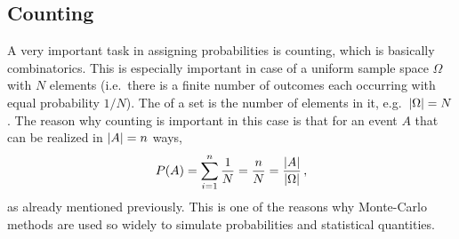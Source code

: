 \begin{table}[t]
\centering



\caption{Visual representation of the sample space of two consecutive coin flips (where a fair coin is assumed, every outcome has the same probability of $\frac{1}{4}$. As the axes labels indicate, the $x$-axis is used for results of the first flip and the $y$-axis for results of the second flip.}

\label{tab:ss_double_coinflip}
\end{table}



	\subsection{Counting}
A very important task in assigning probabilities is counting, which is basically combinatorics. This is especially important in case of a uniform sample space $\Omega$ with $N$ elements (i.e.~there is a finite number of outcomes each occurring with equal probability $1 / N$). The  of a set is the number of elements in it, e.g.~$\abs{\Omega} = N$. The reason why counting is important in this case is that for an event $A$ that can be realized in $\abs{A} = n$ ways,
\begin{equation}
P(A) = \sum_{i = 1}^n \frac{1}{N} = \frac{n}{N} = \frac{\abs{A}}{\abs{\Omega}} \, ,
\end{equation}
as already mentioned previously. This is one of the reasons why Monte-Carlo methods are used so widely to simulate probabilities and statistical quantities.



